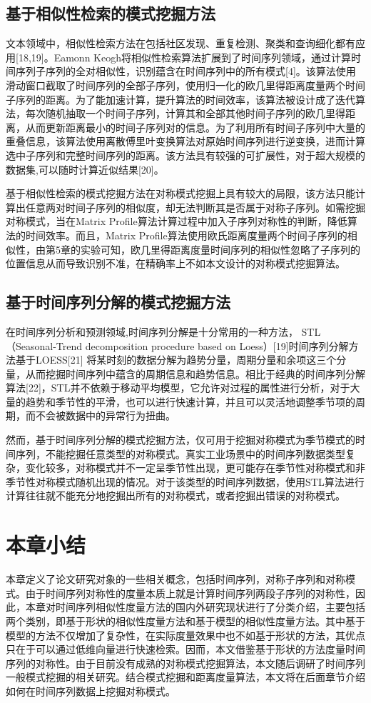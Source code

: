 \subsection{基于相似性检索的模式挖掘方法}
文本领域中，相似性检索方法在包括社区发现、重复检测、聚类和查询细化都有应用[18,19]。Eamonn Keogh将相似性检索算法扩展到了时间序列领域，通过计算时间序列子序列的全对相似性，识别蕴含在时间序列中的所有模式[4]。该算法使用滑动窗口截取了时间序列的全部子序列，使用归一化的欧几里得距离度量两个时间子序列的距离。为了能加速计算，提升算法的时间效率，该算法被设计成了迭代算法，每次随机抽取一个时间子序列，计算其和全部其他时间子序列的欧几里得距离，从而更新距离最小的时间子序列对的信息。为了利用所有时间子序列中大量的重叠信息，该算法使用离散傅里叶变换算法对原始时间序列进行逆变换，进而计算选中子序列和完整时间序列的距离。该方法具有较强的可扩展性，对于超大规模的数据集,可以随时计算近似结果[20]。

基于相似性检索的模式挖掘方法在对称模式挖掘上具有较大的局限，该方法只能计算出任意两对时间子序列的相似度，却无法判断其是否属于对称子序列。如需挖掘对称模式，当在Matrix Profile算法计算过程中加入子序列对称性的判断，降低算法的时间效率。而且，Matrix Profile算法使用欧氏距离度量两个时间子序列的相似性，由第5章的实验可知，欧几里得距离度量时间序列的相似性忽略了子序列的位置信息从而导致识别不准，在精确率上不如本文设计的对称模式挖掘算法。

\subsection{基于时间序列分解的模式挖掘方法}
在时间序列分析和预测领域,时间序列分解是十分常用的一种方法，
STL（Seasonal-Trend decomposition procedure based on Loess）[19]时间序列分解方法基于LOESS[21]
将某时刻的数据分解为趋势分量，周期分量和余项这三个分量，从而挖掘时间序列中蕴含的周期信息和趋势信息。相比于经典的时间序列分解算法[22]，STL并不依赖于移动平均模型，它允许对过程的属性进行分析，对于大量的趋势和季节性的平滑，也可以进行快速计算，并且可以灵活地调整季节项的周期，而不会被数据中的异常行为扭曲。

然而，基于时间序列分解的模式挖掘方法，仅可用于挖掘对称模式为季节模式的时间序列，不能挖掘任意类型的对称模式。真实工业场景中的时间序列数据类型复杂，变化较多，对称模式并不一定呈季节性出现，更可能存在季节性对称模式和非季节性对称模式随机出现的情况。对于该类型的时间序列数据，使用STL算法进行计算往往就不能充分地挖掘出所有的对称模式，或者挖掘出错误的对称模式。

\section{本章小结}
本章定义了论文研究对象的一些相关概念，包括时间序列，对称子序列和对称模式。由于时间序列对称性的度量本质上就是计算时间序列两段子序列的对称性，因此，本章对时间序列相似性度量方法的国内外研究现状进行了分类介绍，主要包括两个类别，即基于形状的相似性度量方法和基于模型的相似性度量方法。其中基于模型的方法不仅增加了复杂性，在实际度量效果中也不如基于形状的方法，其优点只在于可以通过低维向量进行快速检索。因而，本文借鉴基于形状的方法度量时间序列的对称性。由于目前没有成熟的对称模式挖掘算法，本文随后调研了时间序列一般模式挖掘的相关研究。结合模式挖掘和距离度量算法，本文将在后面章节介绍如何在时间序列数据上挖掘对称模式。
